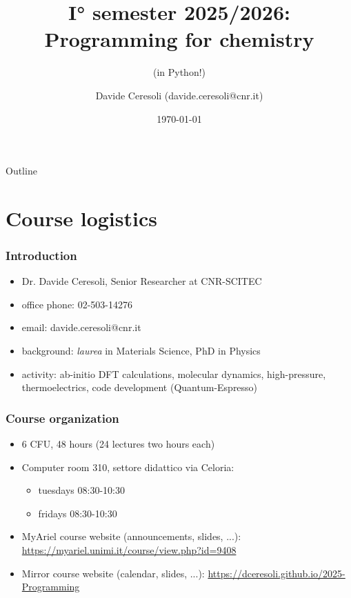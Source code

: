 \documentclass[handout]{beamer}
\title[Prog4Chem]{I° semester 2025/2026: Programming for chemistry}
\subtitle{(in Python!)}
\author[Davide Ceresoli]{Davide Ceresoli (davide.ceresoli@cnr.it)}
\date{\today}
\institute[CNR-SCITEC]{Instituto di Scienze e Tecnologie Chimiche ``G. Natta'' (CNR-SCITEC)}
\begin{document}
\begin{frame}
\titlepage
\end{frame}

\begin{frame}{Outline}
\tableofcontents
\end{frame}



\section{Course logistics}
\begin{frame}[fragile]
  \frametitle{Introduction}
  \begin{itemize}
  \item Dr. Davide Ceresoli, Senior Researcher at CNR-SCITEC
  \item office phone: 02-503-14276
  \item email: davide.ceresoli@cnr.it 
  \item background: \emph{laurea} in Materials Science, PhD in Physics
  \item activity: ab-initio DFT calculations, molecular dynamics, high-pressure, thermoelectrics, code development (Quantum-Espresso)  
  \end{itemize}
\end{frame}

\begin{frame}[fragile]
  \frametitle{Course organization}
  \begin{itemize}
  \item 6 CFU, 48 hours (24 lectures two hours each)
  \item Computer room 310, settore didattico via Celoria:
        \begin{itemize}
        \item tuesdays 08:30-10:30
        \item fridays 08:30-10:30
        \end{itemize}
  \item MyAriel course website (announcements, slides, ...): \url{https://myariel.unimi.it/course/view.php?id=9408}
  \item Mirror course website (calendar, slides, ...): \url{https://dceresoli.github.io/2025-Programming}
  \end{itemize}
\end{frame}
\end{document}
